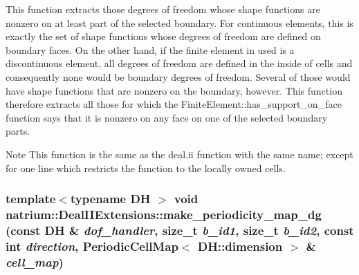 This function extracts those degrees of freedom whose shape functions are nonzero on at least part of the selected boundary. For continuous elements, this is exactly the set of shape functions whose degrees of freedom are defined on boundary faces. On the other hand, if the finite element in used is a discontinuous element, all degrees of freedom are defined in the inside of cells and consequently none would be boundary degrees of freedom. Several of those would have shape functions that are nonzero on the boundary, however. This function therefore extracts all those for which the FiniteElement::has\_\-support\_\-on\_\-face function says that it is nonzero on any face on one of the selected boundary parts. \begin{DoxyNote}{Note}
This function is the same as the deal.ii function with the same name; except for one line which restricts the function to the locally owned cells. 
\end{DoxyNote}
\hypertarget{namespacenatrium_1_1DealIIExtensions_a01f414566020f59f29036fd7e22341b9}{
\subsubsection[{make\_\-periodicity\_\-map\_\-dg}]{\setlength{\rightskip}{0pt plus 5cm}template$<$typename DH $>$ void natrium::DealIIExtensions::make\_\-periodicity\_\-map\_\-dg (const DH \& {\em dof\_\-handler}, \/  size\_\-t {\em b\_\-id1}, \/  size\_\-t {\em b\_\-id2}, \/  const int {\em direction}, \/  PeriodicCellMap$<$ DH::dimension $>$ \& {\em cell\_\-map})}}
\label{namespacenatrium_1_1DealIIExtensions_a01f414566020f59f29036fd7e22341b9}



